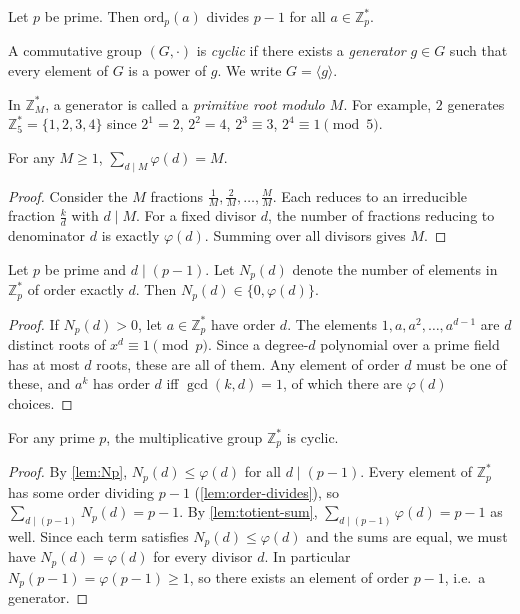 \begin{corollary}
\label{cor:order-prime}
Let $p$ be prime. Then $\mathrm{ord}_p(a)$ divides $p-1$ for all $a \in \mathbb{Z}_p^*$.
\end{corollary}

\begin{definition}
A commutative group $(G,\cdot)$ is \emph{cyclic} if there exists a \emph{generator} $g \in G$ such that every element of $G$ is a power of $g$. We write $G = \langle g \rangle$.
\end{definition}

In $\mathbb{Z}_M^*$, a generator is called a \emph{primitive root modulo $M$}. For example, $2$ generates $\mathbb{Z}_5^* = \{1,2,3,4\}$ since $2^1=2$, $2^2=4$, $2^3 \equiv 3$, $2^4 \equiv 1 \pmod{5}$.

\begin{lemma}
\label{lem:totient-sum}
For any $M \geq 1$, $\displaystyle\sum_{d \mid M} \varphi(d) = M$.
\end{lemma}
\begin{proof}
Consider the $M$ fractions $\frac{1}{M},\frac{2}{M},\dots,\frac{M}{M}$. Each reduces to an irreducible fraction $\frac{k}{d}$ with $d \mid M$. For a fixed divisor $d$, the number of fractions reducing to denominator $d$ is exactly $\varphi(d)$. Summing over all divisors gives $M$.
\end{proof}

\begin{lemma}
\label{lem:Np}
Let $p$ be prime and $d \mid (p-1)$. Let $N_p(d)$ denote the number of elements in $\mathbb{Z}_p^*$ of order exactly $d$. Then $N_p(d) \in \{0, \varphi(d)\}$.
\end{lemma}
\begin{proof}
If $N_p(d)>0$, let $a \in \mathbb{Z}_p^*$ have order $d$. The elements $1, a, a^2, \dots, a^{d-1}$ are $d$ distinct roots of $x^d \equiv 1 \pmod{p}$. Since a degree-$d$ polynomial over a prime field has at most $d$ roots, these are all of them. Any element of order $d$ must be one of these, and $a^k$ has order $d$ iff $\gcd(k,d)=1$, of which there are $\varphi(d)$ choices.
\end{proof}

\begin{theorem}
\label{thm:generators}
For any prime $p$, the multiplicative group $\mathbb{Z}_p^*$ is cyclic.
\end{theorem}
\begin{proof}
By \cref{lem:Np}, $N_p(d) \leq \varphi(d)$ for all $d \mid (p-1)$. Every element of $\mathbb{Z}_p^*$ has some order dividing $p-1$ (\cref{lem:order-divides}), so $\sum_{d \mid (p-1)} N_p(d) = p-1$. By \cref{lem:totient-sum}, $\sum_{d \mid (p-1)} \varphi(d) = p-1$ as well. Since each term satisfies $N_p(d) \leq \varphi(d)$ and the sums are equal, we must have $N_p(d) = \varphi(d)$ for every divisor $d$. In particular $N_p(p-1) = \varphi(p-1) \geq 1$, so there exists an element of order $p-1$, i.e.\ a generator.
\end{proof}

